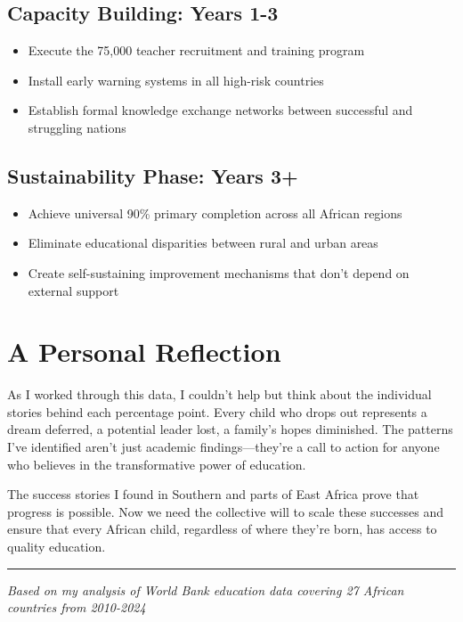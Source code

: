 \documentclass[12pt,a4paper]{article}
\begin{document}
\subsection{Capacity Building: Years 1-3}
\begin{itemize}
    \item Execute the 75,000 teacher recruitment and training program
    \item Install early warning systems in all high-risk countries
    \item Establish formal knowledge exchange networks between successful and struggling nations
\end{itemize}

\subsection{Sustainability Phase: Years 3+}
\begin{itemize}
    \item Achieve universal 90\% primary completion across all African regions
    \item Eliminate educational disparities between rural and urban areas
    \item Create self-sustaining improvement mechanisms that don't depend on external support
\end{itemize}

\section{A Personal Reflection}

As I worked through this data, I couldn't help but think about the individual stories behind each percentage point. Every child who drops out represents a dream deferred, a potential leader lost, a family's hopes diminished. The patterns I've identified aren't just academic findings---they're a call to action for anyone who believes in the transformative power of education.

The success stories I found in Southern and parts of East Africa prove that progress is possible. Now we need the collective will to scale these successes and ensure that every African child, regardless of where they're born, has access to quality education.

\vspace{1cm}
\hrule
\vspace{0.5cm}
\textit{Based on my analysis of World Bank education data covering 27 African countries from 2010-2024}
\end{document}

